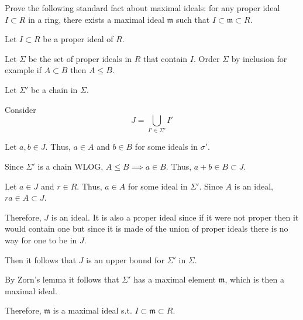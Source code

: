 \documentclass[12pt, letterpaper]{article}
\begin{document}
\color{\TextColor}
\pagecolor{\colormode}
\setlength{\parindent}{0pt}
\pagestyle{fancy}
\fancyhf{}


\begin{problem}{}
    Prove the following standard fact about maximal ideals: for any proper ideal
    $I \subset R$ in a ring, there exists a maximal ideal $\mathfrak{m}$ such that $I \subset \mathfrak{m} \subset R$.
\end{problem}
\begin{problemproof}
    Let $I \subset R$ be a proper ideal of $R$.

    Let $\Sigma$ be the set of proper ideals in $R$ that contain $I$. Order $\Sigma$ by inclusion for example if $A \subset B$ then $A \leq B$.

    Let $\Sigma'$ be a chain in $\Sigma$.

    Consider \[J = \bigcup_{I' \in \Sigma'} I'\]

    Let $a,b \in J$. Thus, $a \in A$ and $b \in B$ for some ideals in $\sigma'$.

    Since $\Sigma'$ is a chain WLOG, $A \leq B \implies a \in B$. Thus, $a+b \in B \subset J$.

    Let $a \in J$ and $r \in R$. Thus, $a \in A$ for some ideal in $\Sigma'$. Since $A$ is an ideal, $ra \in A \subset J$.

    Therefore, $J$ is an ideal. It is also a proper ideal since if it were not proper then it would contain one but since it is made of the union of proper ideals there is no way for one to be in $J$.

    Then it follows that $J$ is an upper bound for $\Sigma'$ in $\Sigma$.

    By Zorn's lemma it follows that $\Sigma'$ has a maximal element $\mathfrak{m}$, which is then a maximal ideal.

    Therefore, $\mathfrak{m}$ is a maximal ideal s.t. $I \subset \mathfrak{m} \subset R$.
\end{problemproof}

\end{document}
